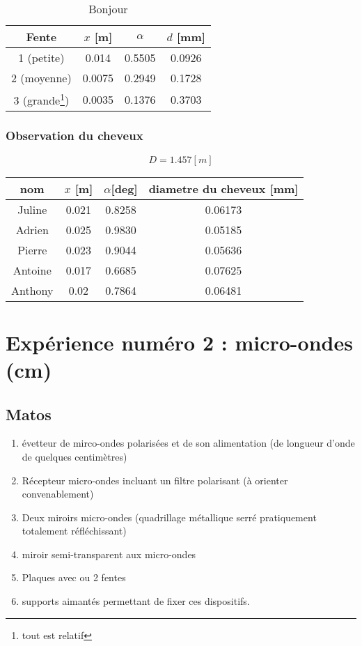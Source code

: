 \documentclass[a4paper,11pt]{article}
\begin{document}
\begin{table}[h!]
\centering 
\begin{tabular}{|c|c|c|c|}
\hline
	Fente & $x$ [m]& $\alpha$ & $d$ [mm] \\
\hline
	1 (petite) & 0.014 & 0.5505 & 0.0926 \\
	2 (moyenne) & 0.0075 & 0.2949 & 0.1728 \\
	3 (grande\footnote{tout est relatif}) & 0.0035 & 0.1376 & 0.3703 \\
\hline
\end{tabular}
\caption{Bonjour}
\end{table}
\subsubsection{Observation du cheveux}
$$ D = 1.457 [m] $$

\centering
\begin{tabular}{|c|c|c|c|}
	\hline
	nom & $x$ [m] & $\alpha$[deg] & diametre du cheveux [mm] \\
	\hline
	Juline & 0.021 & 0.8258 & 0.06173 \\
	Adrien & 0.025 & 0.9830  & 0.05185 \\
	Pierre & 0.023 & 0.9044  & 0.05636 \\
	Antoine & 0.017 & 0.6685 & 0.07625 \\
	Anthony & 0.02 & 0.7864 & 0.06481 \\
	\hline
\end{tabular}
\section{Expérience numéro 2 : micro-ondes (cm)}
\subsection{Matos}
\begin{enumerate}
	\item évetteur de mirco-ondes polarisées et de son alimentation (de longueur d'onde de quelques centimètres)
	\item Récepteur micro-ondes incluant un filtre polarisant (à orienter convenablement)
	\item Deux miroirs micro-ondes (quadrillage métallique serré pratiquement totalement réfléchissant)
	\item miroir semi-transparent aux micro-ondes
	\item Plaques avec ou 2 fentes
	\item supports aimantés permettant de fixer ces dispositifs.
\end{enumerate}
\end{document}
